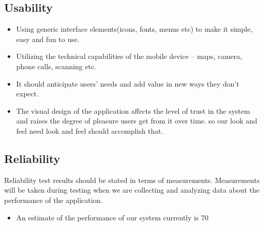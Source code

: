 \documentclass[english]{article}
\begin{document}
	\subsection{Usability}
	  \begin{itemize}
		\item Using generic interface elements(icons, fonts, menus etc) to make it simple, easy and fun to use.
		\item Utilizing the technical capabilities of the mobile device – maps, camera, phone calls, scanning etc. 
		\item It should anticipate users' needs and add value in new ways they don't expect.
		\item The visual design of the application affects the level of trust in the system and raises the degree of pleasure users get from it over time. so our look and feel need look and feel should accomplish that.
	  \end{itemize}
	\subsection{Reliability}
	Reliability test results should be stated in terms of measurements. Measurements will be taken during testing when we are collecting and analyzing data about the performance of the application.
	\begin{itemize}
		\item  An estimate of the performance of our system currently is 70%
	\end{itemize}
	



	
\end{document}
